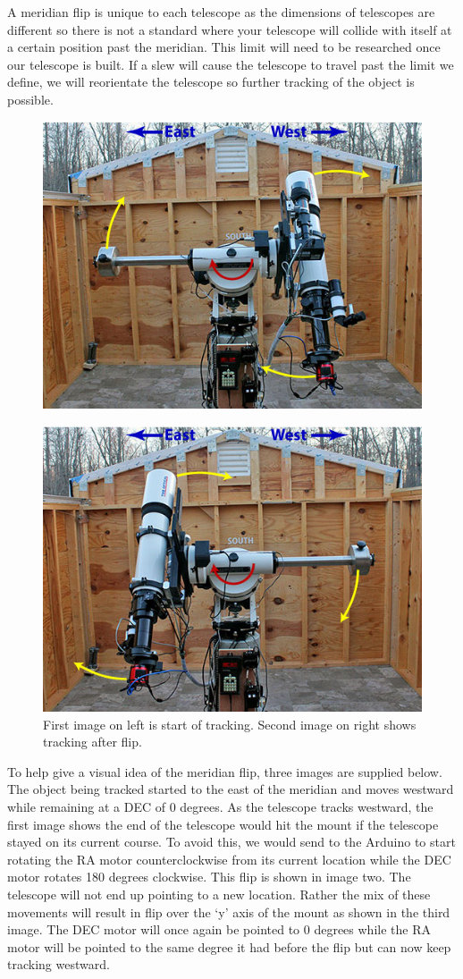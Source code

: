 \documentclass[12pt]{report}
\begin{document}
A meridian flip is unique to each telescope as the dimensions of telescopes are different so there is not a standard where your telescope will collide with itself at a certain position past the meridian. This limit will need to be researched once our telescope is built. If a slew will cause the telescope to travel past the limit we define, we will reorientate the telescope so further tracking of the object is possible.

\clearpage

\begin{figure}[h]
  \centering

  \includegraphics[width=0.6\linewidth]{beforeflip}
\end{figure}

\begin{figure}[h]
  \centering
  \includegraphics[width=0.6\linewidth]{afterflip}
   \caption{First image on left is start of tracking. Second image on right shows tracking after flip.}
\end{figure}

To help give a visual idea of the meridian flip, three images are supplied below. The object being tracked started to the east of the meridian and moves westward while remaining at a DEC of 0 degrees. As the telescope tracks westward, the first image shows the end of the telescope would hit the mount if the telescope stayed on its current course. To avoid this, we would send to the Arduino to start rotating the RA motor counterclockwise from its current location while the DEC motor rotates 180 degrees clockwise. This flip is shown in image two. The telescope will not end up pointing to a new location. Rather the mix of these movements will result in flip over the ‘y’ axis of the mount as shown in the third image. The DEC motor will once again be pointed to 0 degrees while the RA motor will be pointed to the same degree it had before the flip but can now keep tracking westward.
\end{document}
